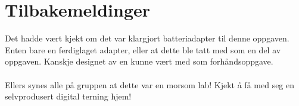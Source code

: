 \documentclass[12pt,norsk,a4paper]{article}
\begin{document}
\clearpage

\section{Tilbakemeldinger}
Det hadde vært kjekt om det var klargjort batteriadapter til denne oppgaven. Enten bare en ferdiglaget adapter, eller at dette ble tatt med som en del av oppgaven. Kanskje designet av en kunne vært med som forhåndsoppgave.\\
\\
Ellers synes alle på gruppen at dette var en morsom lab! Kjekt å få med seg en selvprodusert digital terning hjem!
\clearpage
\end{document}
